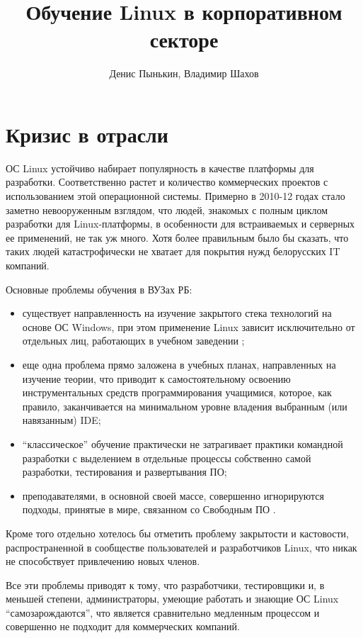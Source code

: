 \documentclass[10pt, a5paper]{article}
\begin{document}
\title{Обучение Linux в корпоративном секторе}
\author{Денис Пынькин, Владимир Шахов}
\maketitle
\section{Кризис в отрасли}

ОС Linux устойчиво набирает популярность в качестве платформы для разработки. Соответственно растет и количество коммерческих проектов с использованием этой операционной системы. Примерно в 2010-12 годах стало заметно невооруженным взглядом, что людей, знакомых с полным циклом разработки
для Linux-платформы, в особенности для встраиваемых и серверных ее применений, не так уж много. Хотя более правильным было бы сказать, что таких людей катастрофически не хватает для покрытия нужд белорусских IT компаний.

Основные проблемы обучения в ВУЗах РБ:

\begin{itemize}
  \item существует направленность на изучение закрытого стека технологий на основе ОС Windows, при этом применение Linux зависит исключительно от отдельных лиц, работающих в учебном заведении \cite{bib1};
  \item еще одна проблема прямо заложена в учебных планах, направленных на изучение теории, что приводит к самостоятельному освоению инструментальных средств программирования учащимися, которое, как правило, заканчивается на минимальном уровне владения выбранным (или навязанным) IDE;
  \item “классическое” обучение практически не затрагивает практики командной разработки с выделением в отдельные процессы собственно самой разработки, тестирования и развертывания ПО;
  \item преподавателями, в основной своей массе, совершенно игнорируются подходы, принятые в мире, связанном со Свободным ПО \cite{bib2}.
\end{itemize}

Кроме того отдельно хотелось бы отметить проблему закрытости и кастовости, распространенной в сообществе пользователей и разработчиков Linux, что никак не способствует привлечению новых членов.

Все эти проблемы приводят к тому, что разработчики, тестировщики и, в меньшей степени, администраторы, умеющие работать и знающие ОС Linux “самозарождаются”, что  является сравнительно медленным процессом и совершенно не подходит для коммерческих компаний.
\end{document}
